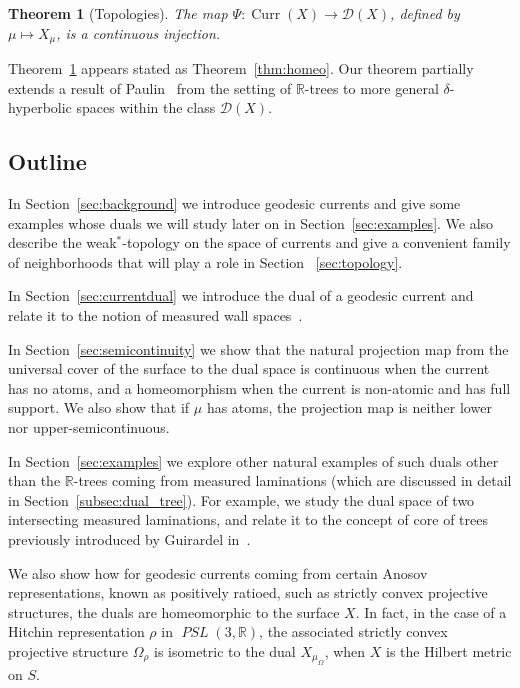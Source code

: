 \documentclass[12pt,article]{amsart}
\numberwithin{equation}{section}
\numberwithin{figure}{section}
\newtheorem{mainthm}{Theorem}
\theoremstyle{definition}
\theoremstyle{plain}
\DeclareMathOperator{\Curr}{Curr}
\DeclareMathOperator{\PSL}{\mathit{PSL}}
\begin{document}
\begin{mainthm}[Topologies]
\label{thm:homeointroduction}
The map $\Psi \colon \Curr(X) \to \mathcal{D}(X)$, defined by $\mu \mapsto X_{\mu}$, is a continuous injection.
\end{mainthm}
Theorem~\ref{thm:homeointroduction} appears stated as Theorem~\ref{thm:homeo}.
Our theorem partially extends a result of Paulin~\cite{Pa89:Paulin1989TheGT} from the setting of $\mathbb{R}$-trees to more general $\delta$-hyperbolic spaces within the class $\mathcal{D}(X)$.

\subsection{Outline}

In Section~\ref{sec:background} we introduce geodesic currents and give some examples whose duals we will study later on in Section~\ref{sec:examples}. We also describe the weak$^*$-topology on the space of currents and give a convenient family of neighborhoods that will play a role in Section ~\ref{sec:topology}.

In Section~\ref{sec:currentdual} we introduce the dual of a geodesic current and relate it to the notion of measured wall spaces~\cite{CD17:MedianMeasuredWall}.

In Section~\ref{sec:semicontinuity} we show that the natural projection map from the universal cover of the surface to the dual space is continuous when the current has no atoms, and a homeomorphism when the current is non-atomic and has full support. We also show that if $\mu$ has atoms, the projection map is neither lower nor upper-semicontinuous.

 In Section~\ref{sec:examples} we explore other natural examples of such duals other than the $\mathbb{R}$-trees coming from measured laminations (which are discussed in detail in Section~\ref{subsec:dual_tree}). For example, we study the dual space of two intersecting measured laminations, and relate it to the concept of core of trees previously introduced by Guirardel in~\cite{Gui05:Coeur}. 
 
 We also show how for geodesic currents coming from certain Anosov representations, known as positively ratioed, such as strictly convex projective structures, the duals are homeomorphic to the surface $X$. In fact, in the case of a Hitchin representation $\rho$ in $\PSL(3,\mathbb{R})$, the associated strictly convex projective structure $\Omega_{\rho}$ is isometric to the dual $X_{\mu_{\Omega}}$, when $X$ is the Hilbert metric on $S$.
\end{document}
